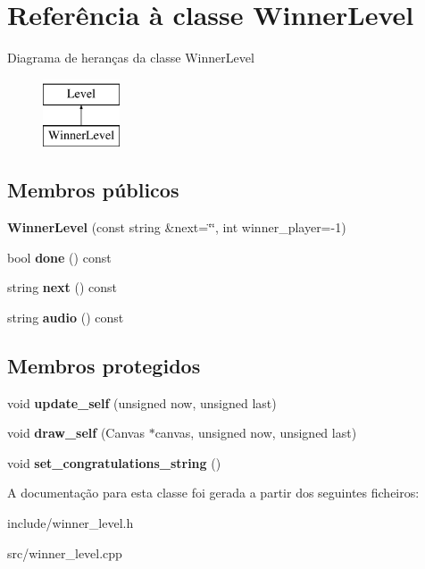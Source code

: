 \hypertarget{classWinnerLevel}{}\section{Referência à classe Winner\+Level}
\label{classWinnerLevel}
Diagrama de heranças da classe Winner\+Level\begin{figure}[H]
\begin{center}
\leavevmode
\includegraphics[height=2.000000cm]{classWinnerLevel}
\end{center}
\end{figure}
\subsection*{Membros públicos}
\begin{DoxyCompactItemize}
\item 
\mbox{\label{classWinnerLevel_a63bb2594f3694e69e2735e143448b799}} 
{\bfseries Winner\+Level} (const string \&next=\char`\"{}\char`\"{}, int winner\+\_\+player=-\/1)
\item 
\mbox{\label{classWinnerLevel_afc61ffd9b0457d81a2ed7400dc3490df}} 
bool {\bfseries done} () const
\item 
\mbox{\label{classWinnerLevel_a927da981a2a9c97d0ff41d3a33b3457a}} 
string {\bfseries next} () const
\item 
\mbox{\label{classWinnerLevel_a855561f4edd534aa309d2b2a5d6ee3bd}} 
string {\bfseries audio} () const
\end{DoxyCompactItemize}
\subsection*{Membros protegidos}
\begin{DoxyCompactItemize}
\item 
\mbox{\label{classWinnerLevel_a5410c32163d0541883db5f7f54623e80}} 
void {\bfseries update\+\_\+self} (unsigned now, unsigned last)
\item 
\mbox{\label{classWinnerLevel_a0b58acd2f2c85ce28df09260684f3180}} 
void {\bfseries draw\+\_\+self} (Canvas $\ast$canvas, unsigned now, unsigned last)
\item 
\mbox{\label{classWinnerLevel_a22e2395a8b72405050c2a321aa1fb644}} 
void {\bfseries set\+\_\+congratulations\+\_\+string} ()
\end{DoxyCompactItemize}


A documentação para esta classe foi gerada a partir dos seguintes ficheiros\+:\begin{DoxyCompactItemize}
\item 
include/winner\+\_\+level.\+h\item 
src/winner\+\_\+level.\+cpp\end{DoxyCompactItemize}
